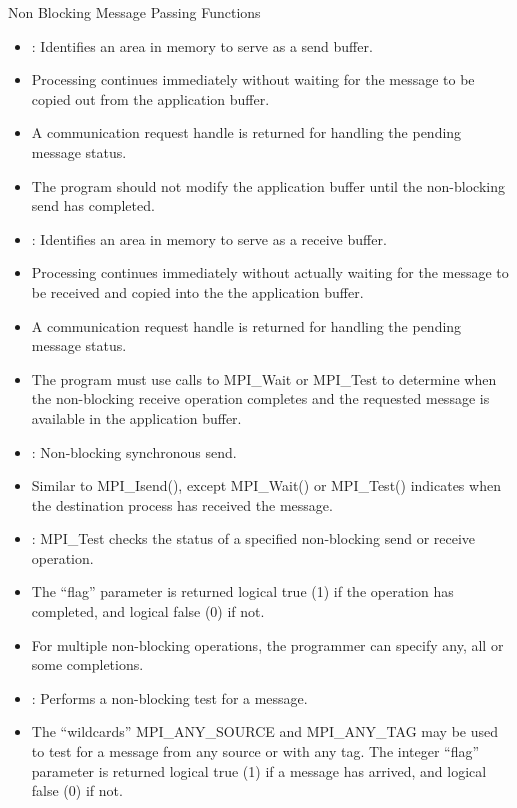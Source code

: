 \documentclass[9pt,c]{beamer}
\begin{document}
\begin{frame}{Non Blocking Message Passing Functions}
  \begin{itemize}
    \item {}: Identifies an area in memory to serve as a send buffer.
    \item[] Processing continues immediately without waiting for the message to be copied out from the application buffer. 
    \item[] A communication request handle is returned for handling the pending message status. 
    \item[] The program should not modify the application buffer until the non-blocking send has completed.
    \item {}: Identifies an area in memory to serve as a receive buffer. 
    \item[] Processing continues immediately without actually waiting for the message to be received and copied into the the application buffer. 
    \item[] A communication request handle is returned for handling the pending message status. 
    \item[] The program must use calls to MPI\_Wait or MPI\_Test to determine when the non-blocking receive operation completes and the requested message is available in the application buffer.
    \item {}: Non-blocking synchronous send. 
    \item[] Similar to MPI\_Isend(), except MPI\_Wait() or MPI\_Test() indicates when the destination process has received the message.
    \framebreak
    \item {}: MPI\_Test checks the status of a specified non-blocking send or receive operation. 
    \item[] The “flag” parameter is returned logical true (1) if the operation has completed, and logical false (0) if not. 
    \item[] For multiple non-blocking operations, the programmer can specify any, all or some completions.
    \item {}: Performs a non-blocking test for a message. 
    \item[] The “wildcards” MPI\_ANY\_SOURCE and MPI\_ANY\_TAG may be used to test for a message from any source or with any tag. The integer “flag” parameter is returned logical true (1) if a message has arrived, and logical false (0) if not. 

\end{itemize}
\end{frame}
\end{document}
